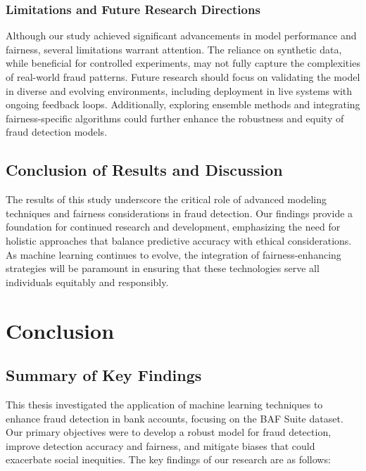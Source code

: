 \documentclass[12pt,a4paper]{report}
\begin{document}
\subsection{Limitations and Future Research Directions}

Although our study achieved significant advancements in model performance and fairness, several limitations warrant attention. The reliance on synthetic data, while beneficial for controlled experiments, may not fully capture the complexities of real-world fraud patterns. Future research should focus on validating the model in diverse and evolving environments, including deployment in live systems with ongoing feedback loops. Additionally, exploring ensemble methods and integrating fairness-specific algorithms could further enhance the robustness and equity of fraud detection models.

\section{Conclusion of Results and Discussion}

The results of this study underscore the critical role of advanced modeling techniques and fairness considerations in fraud detection. Our findings provide a foundation for continued research and development, emphasizing the need for holistic approaches that balance predictive accuracy with ethical considerations. As machine learning continues to evolve, the integration of fairness-enhancing strategies will be paramount in ensuring that these technologies serve all individuals equitably and responsibly.

\clearpage

\chapter{Conclusion}

\section{Summary of Key Findings}

This thesis investigated the application of machine learning techniques to enhance fraud detection in bank accounts, focusing on the BAF Suite dataset. Our primary objectives were to develop a robust model for fraud detection, improve detection accuracy and fairness, and mitigate biases that could exacerbate social inequities. The key findings of our research are as follows:
\end{document}
